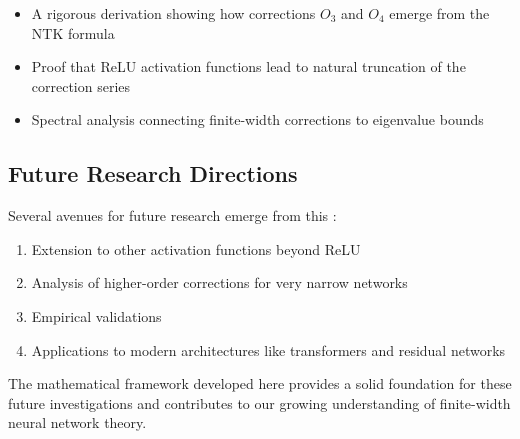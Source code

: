 \documentclass[11pt,a4paper]{article}
\theoremstyle{definition}
\begin{document}
\begin{itemize}
\item A rigorous derivation showing how corrections $O_3$ and $O_4$ emerge from the NTK formula
\item Proof that ReLU activation functions lead to natural truncation of the correction series
\item Spectral analysis connecting finite-width corrections to eigenvalue bounds
\end{itemize}

\subsection{Future Research Directions}

Several avenues for future research emerge from this :

\begin{enumerate}
\item Extension to other activation functions beyond ReLU
\item Analysis of higher-order corrections for very narrow networks
\item Empirical validations
\item Applications to modern architectures like transformers and residual networks
\end{enumerate}

The mathematical framework developed here provides a solid foundation for these future investigations and contributes to our growing understanding of finite-width neural network theory.

\newpage



\end{document}
